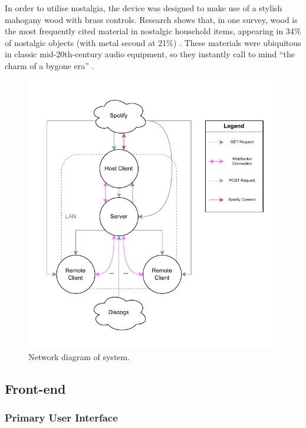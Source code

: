                 In order to utilise nostalgia, the device was designed to make use of a stylish mahogany wood with brass controls. Research shows that, in one survey, wood is the most frequently cited material in nostalgic household items, appearing in 34\% of nostalgic objects (with metal second at 21\%) \cite{Skinner2022}. These materials were ubiquitous in classic mid-20th-century audio equipment, so they instantly call to mind ``the charm of a bygone era'' \cite{LookInTheAttic2024}.
    
                \begin{figure}[h]
                    \centering
                    \includegraphics[width=\textwidth]{images/VTT_network.NetworkDiagram.pdf}
                    \caption{Network diagram of system.}
                    \label{fig:networkDiagram}
                \end{figure}
        
        \subsection{Front-end}
            \subsubsection{Primary User Interface}
    
